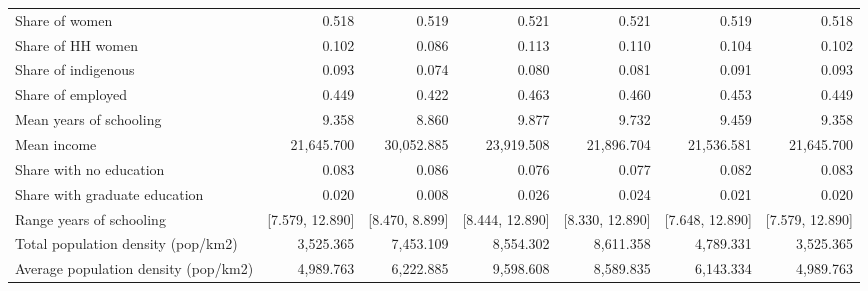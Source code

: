 \begin{tabular}{lrrrrrr}
    Share of women & 0.518 & 0.519 & 0.521 & 0.521 & 0.519 & 0.518 \\
    Share of HH women & 0.102 & 0.086 & 0.113 & 0.110 & 0.104 & 0.102 \\
    Share of indigenous & 0.093 & 0.074 & 0.080 & 0.081 & 0.091 & 0.093 \\
    Share of employed & 0.449 & 0.422 & 0.463 & 0.460 & 0.453 & 0.449 \\
    Mean years of schooling & 9.358 & 8.860 & 9.877 & 9.732 & 9.459 & 9.358 \\
    Mean income & 21,645.700 & 30,052.885 & 23,919.508 & 21,896.704 & 21,536.581 & 21,645.700 \\
    Share with no education & 0.083 & 0.086 & 0.076 & 0.077 & 0.082 & 0.083 \\
    Share with graduate education & 0.020 & 0.008 & 0.026 & 0.024 & 0.021 & 0.020 \\
    Range years of schooling & [7.579, 12.890] & [8.470, 8.899] & [8.444, 12.890] & [8.330, 12.890] & [7.648, 12.890] & [7.579, 12.890] \\
    Total population density (pop/km2) & 3,525.365 & 7,453.109 & 8,554.302 & 8,611.358 & 4,789.331 & 3,525.365 \\
    Average population density (pop/km2) & 4,989.763 & 6,222.885 & 9,598.608 & 8,589.835 & 6,143.334 & 4,989.763 \\
    \bottomrule
    \bottomrule
\end{tabular}
